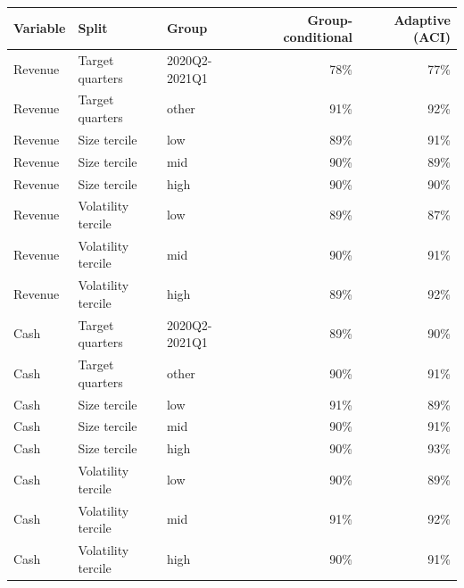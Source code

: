 \begin{tabular}{lllrr}
\toprule
Variable & Split & Group & Group-conditional & Adaptive (ACI) \\
\midrule
Revenue & Target quarters & 2020Q2-2021Q1 & 78\% & 77\% \\
Revenue & Target quarters & other & 91\% & 92\% \\
Revenue & Size tercile & low & 89\% & 91\% \\
Revenue & Size tercile & mid & 90\% & 89\% \\
Revenue & Size tercile & high & 90\% & 90\% \\
Revenue & Volatility tercile & low & 89\% & 87\% \\
Revenue & Volatility tercile & mid & 90\% & 91\% \\
Revenue & Volatility tercile & high & 89\% & 92\% \\
\addlinespace
Cash & Target quarters & 2020Q2-2021Q1 & 89\% & 90\% \\
Cash & Target quarters & other & 90\% & 91\% \\
Cash & Size tercile & low & 91\% & 89\% \\
Cash & Size tercile & mid & 90\% & 91\% \\
Cash & Size tercile & high & 90\% & 93\% \\
Cash & Volatility tercile & low & 90\% & 89\% \\
Cash & Volatility tercile & mid & 91\% & 92\% \\
Cash & Volatility tercile & high & 90\% & 91\% \\
\bottomrule
\end{tabular}
